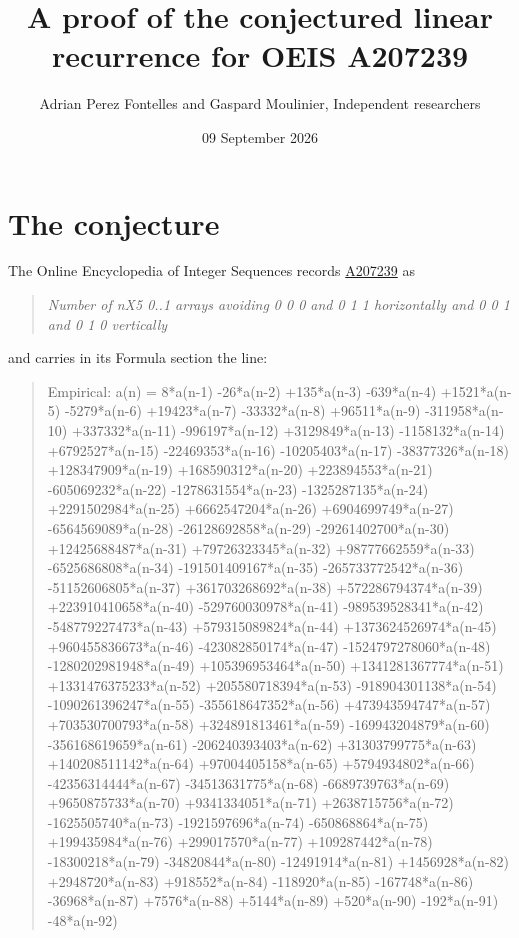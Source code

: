 \documentclass[11pt]{article}
\title{A proof of the conjectured linear recurrence for OEIS A207239}
\author{Adrian Perez Fontelles and Gaspard Moulinier, Independent researchers}
\date{09 September 2026}
\theoremstyle{definition}
\begin{document}
\maketitle
\section{The conjecture}

The Online Encyclopedia of Integer Sequences records \href{https://oeis.org/A207239}{A207239} as

\begin{quote}\itshape Number of nX5 0..1 arrays avoiding 0 0 0 and 0 1 1 horizontally and 0 0 1 and 0 1 0 vertically\end{quote}

and carries in its Formula section the line:

\begin{quote}\ttfamily Empirical: a(n) = 8*a(n-1) -26*a(n-2) +135*a(n-3) -639*a(n-4) +1521*a(n-5) -5279*a(n-6) +19423*a(n-7) -33332*a(n-8) +96511*a(n-9) -311958*a(n-10) +337332*a(n-11) -996197*a(n-12) +3129849*a(n-13) -1158132*a(n-14) +6792527*a(n-15) -22469353*a(n-16) -10205403*a(n-17) -38377326*a(n-18) +128347909*a(n-19) +168590312*a(n-20) +223894553*a(n-21) -605069232*a(n-22) -1278631554*a(n-23) -1325287135*a(n-24) +2291502984*a(n-25) +6662547204*a(n-26) +6904699749*a(n-27) -6564569089*a(n-28) -26128692858*a(n-29) -29261402700*a(n-30) +12425688487*a(n-31) +79726323345*a(n-32) +98777662559*a(n-33) -6525686808*a(n-34) -191501409167*a(n-35) -265733772542*a(n-36) -51152606805*a(n-37) +361703268692*a(n-38) +572286794374*a(n-39) +223910410658*a(n-40) -529760030978*a(n-41) -989539528341*a(n-42) -548779227473*a(n-43) +579315089824*a(n-44) +1373624526974*a(n-45) +960455836673*a(n-46) -423082850174*a(n-47) -1524797278060*a(n-48) -1280202981948*a(n-49) +105396953464*a(n-50) +1341281367774*a(n-51) +1331476375233*a(n-52) +205580718394*a(n-53) -918904301138*a(n-54) -1090261396247*a(n-55) -355618647352*a(n-56) +473943594747*a(n-57) +703530700793*a(n-58) +324891813461*a(n-59) -169943204879*a(n-60) -356168619659*a(n-61) -206240393403*a(n-62) +31303799775*a(n-63) +140208511142*a(n-64) +97004405158*a(n-65) +5794934802*a(n-66) -42356314444*a(n-67) -34513631775*a(n-68) -6689739763*a(n-69) +9650875733*a(n-70) +9341334051*a(n-71) +2638715756*a(n-72) -1625505740*a(n-73) -1921597696*a(n-74) -650868864*a(n-75) +199435984*a(n-76) +299017570*a(n-77) +109287442*a(n-78) -18300218*a(n-79) -34820844*a(n-80) -12491914*a(n-81) +1456928*a(n-82) +2948720*a(n-83) +918552*a(n-84) -118920*a(n-85) -167748*a(n-86) -36968*a(n-87) +7576*a(n-88) +5144*a(n-89) +520*a(n-90) -192*a(n-91) -48*a(n-92)\end{quote}
\end{document}
